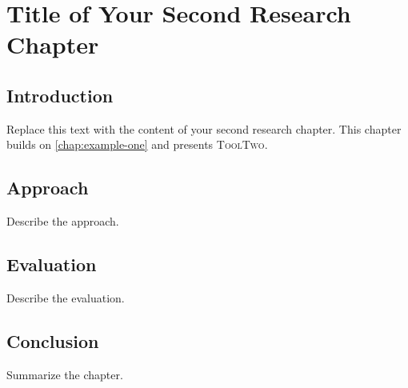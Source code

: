
\newcommand{\tooltwo}{\textsc{ToolTwo}\xspace}

\chapter{Title of Your Second Research Chapter}
\label{chap:example-two}


\section{Introduction}

Replace this text with the content of your second research chapter.
This chapter builds on \autoref{chap:example-one} and presents
\tooltwo.

\section{Approach}

Describe the approach.

\section{Evaluation}

Describe the evaluation.

\section{Conclusion}

Summarize the chapter.
